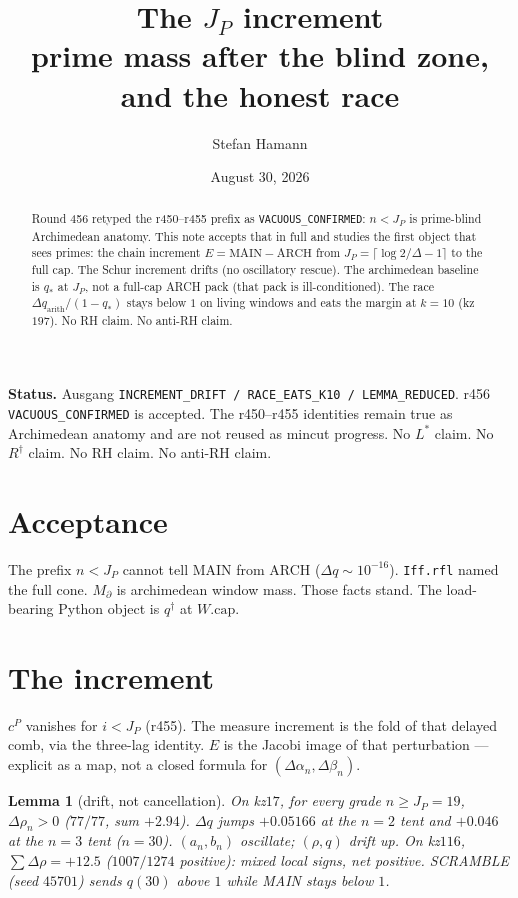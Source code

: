 \documentclass[11pt]{article}
\title{\bfseries The $J_P$ increment\\[2mm]
\large prime mass after the blind zone, and the honest race}
\author{Stefan Hamann}
\date{August 30, 2026}
\newtheorem{lemma}{Lemma}
\begin{document}
\maketitle

\begin{abstract}\noindent
Round 456 retyped the r450--r455 prefix as
\texttt{VACUOUS\_CONFIRMED}:
$n<J_P$ is prime-blind Archimedean anatomy.
This note accepts that in full and studies
the first object that sees primes:
the chain increment
$E=\mathrm{MAIN}-\mathrm{ARCH}$ from
$J_P=\lceil\log 2/\Delta-1\rceil$ to the
full cap.
The Schur increment drifts (no oscillatory
rescue).  The archimedean baseline is
$q_*$ at $J_P$, not a full-cap ARCH pack
(that pack is ill-conditioned).
The race $\Delta q_{\mathrm{arith}}/(1-q_*)$
stays below $1$ on living windows and
eats the margin at $k=10$ (kz$197$).
No RH claim.  No anti-RH claim.
\end{abstract}

\medskip\noindent
\textbf{Status.}\enspace
Ausgang
\texttt{INCREMENT\_DRIFT / RACE\_EATS\_K10 / LEMMA\_REDUCED}.
r456 \texttt{VACUOUS\_CONFIRMED} is accepted.
The r450--r455 identities remain true as
Archimedean anatomy and are not reused as
mincut progress.
No $L^{*}$ claim.  No $R^{\dagger}$ claim.
No RH claim.  No anti-RH claim.

\section{Acceptance}\label{sec:acc}

The prefix $n<J_P$ cannot tell MAIN from
ARCH ($\Delta q\sim10^{-16}$).
\texttt{Iff.rfl} named the full cone.
$M_\partial$ is archimedean window mass.
Those facts stand.  The load-bearing
Python object is $q^{\dagger}$ at
$W.\mathrm{cap}$.

\section{The increment}\label{sec:A}

$c^P$ vanishes for $i<J_P$ (r455).
The measure increment is the fold of
that delayed comb, via the three-lag
identity.
$E$ is the Jacobi image of that
perturbation --- explicit as a map,
not a closed formula for
$(\Delta\alpha_n,\Delta\beta_n)$.

\begin{lemma}[drift, not cancellation]\label{lem:drift}
On kz$17$, for every grade $n\ge J_P=19$,
$\Delta\rho_n>0$ ($77/77$, sum $+2.94$).
$\Delta q$ jumps $+0.05166$ at the $n=2$
tent and $+0.046$ at the $n=3$ tent
($n=30$).
$(a_n,b_n)$ oscillate; $(\rho,q)$ drift up.
On kz$116$, $\sum\Delta\rho=+12.5$
($1007/1274$ positive): mixed local
signs, net positive.
SCRAMBLE (seed $45701$) sends $q(30)$
above $1$ while MAIN stays below $1$.
\end{lemma}
\end{document}
